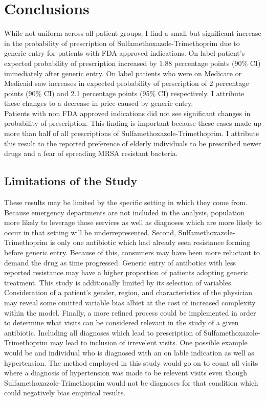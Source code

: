 \chapter{Conclusions}
While not uniform across all patient groups, I find a small but significant increase in the probability of prescription of Sulfamethoxazole-Trimethoprim due to generic entry for patients with FDA approved indications. On label patient's expected probability of prescription increased by 1.88 percentage points (90\% CI) immediately after generic entry. On label patients who were on Medicare or Medicaid saw increases in expected probability of perscription of 2 percentage points (90\% CI) and 2.1 percentage points (95\% CI) respectively. I attribute these changes to a decrease in price caused by generic entry.\\
\indent Patients with non FDA approved indications did not see significant changes in probability of prescription. This finding is important because these cases made up more than half of all prescriptions of Sulfamethoxazole-Trimethoprim. I attribute this result to the reported preference of elderly individuals to be prescribed newer drugs and a fear of spreading MRSA resistant bacteria.

\section{Limitations of the Study}
These results may be limited by the specific setting in which they come from. Because emergency departments are not included in the analysis, population more likely to leverage those services as well as diagnoses which are more likely to occur in that setting will be underrepresented. Second, Sulfamethoxazole-Trimethoprim is only one antibiotic which had already seen resistance forming before generic entry. Because of this, consumers may have been more reluctant to demand the drug as time progressed. Generic entry of antibotics with less reported resistance may have a higher proportion of patients adopting generic treatment. This study is additionally limited by its selection of variables. Consideration of a patient's gender, region, and characteristics of the physician may reveal some omitted variable bias albiet at the cost of increased complexity within the model. Finally, a more refined process could be implemented in order to determine what visits can be considered relevant in the study of a given antibiotic. Including all diagnoses which lead to prescription of Sulfamethoxazole-Trimethoprim may lead to inclusion of irrevelent visits. One possible example would be and individual who is diagnosed with an on lable indication as well as hypertension. The method employed in this study would go on to count all visits where a diagnosis of hypertension was made to be relevent visits even though Sulfamethoxazole-Trimethoprim would not be diagnoses for that condition which could negatively bias empirical results. 

